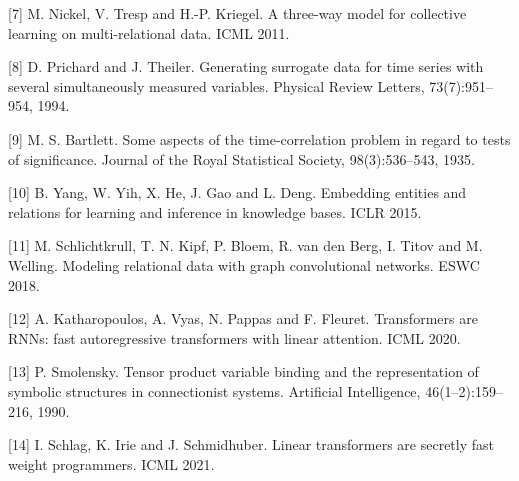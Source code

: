 \documentclass[10pt,letterpaper,twocolumn]{article}
\begin{document}
{[}7{]} M. Nickel, V. Tresp and H.-P. Kriegel. A three-way model for collective learning on
multi-relational data. ICML 2011.

{[}8{]} D. Prichard and J. Theiler. Generating surrogate data for time series with several
simultaneously measured variables. Physical Review Letters, 73(7):951--954, 1994.

{[}9{]} M. S. Bartlett. Some aspects of the time-correlation problem in regard to tests of significance.
Journal of the Royal Statistical Society, 98(3):536--543, 1935.

{[}10{]} B. Yang, W. Yih, X. He, J. Gao and L. Deng. Embedding entities and relations for learning and
inference in knowledge bases. ICLR 2015.

{[}11{]} M. Schlichtkrull, T. N. Kipf, P. Bloem, R. van den Berg, I. Titov and M. Welling. Modeling
relational data with graph convolutional networks. ESWC 2018.

{[}12{]} A. Katharopoulos, A. Vyas, N. Pappas and F. Fleuret. Transformers are RNNs: fast autoregressive
transformers with linear attention. ICML 2020.

{[}13{]} P. Smolensky. Tensor product variable binding and the representation of symbolic structures in
connectionist systems. Artificial Intelligence, 46(1--2):159--216, 1990.

{[}14{]} I. Schlag, K. Irie and J. Schmidhuber. Linear transformers are secretly fast weight
programmers. ICML 2021.
\end{document}
